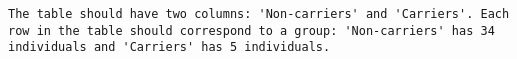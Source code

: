 \begin{verbatim}
The table should have two columns: 'Non-carriers' and 'Carriers'. Each row in the table should correspond to a group: 'Non-carriers' has 34 individuals and 'Carriers' has 5 individuals.
\end{verbatim}
